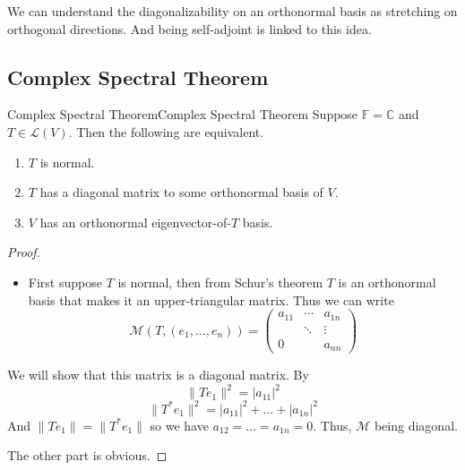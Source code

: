 \documentclass[../main.tex]{subfiles}
\begin{document}
\begin{remark}
We can understand the diagonalizability on an orthonormal basis as stretching on orthogonal directions. And being self-adjoint is linked to this idea.
\end{remark}

\subsection{Complex Spectral Theorem}

\begin{theorem}{Complex Spectral Theorem}{Complex Spectral Theorem}
Suppose $\mathbb{F}=\mathbb{C}$ and $T\in \mathscr{L}(V)$. Then the following are equivalent.
\begin{enumerate}
	\item $T$ is normal.
	\item $T$ has a diagonal matrix to some orthonormal basis of $V$.
	\item $V$ has an orthonormal eigenvector-of-$T$ basis.
\end{enumerate}
\end{theorem}
\begin{proof}
\begin{itemize}
\item First suppose $T$ is normal, then from Schur's theorem $T$ is an orthonormal basis that makes it an upper-triangular matrix. Thus we can write
	\begin{equation*}
	\mathscr{M}(T,(e_1, \ldots ,e_n)) = 
	\begin{pmatrix}
		a_{11} & \cdots & a _{1n}\\
		       & \ddots & \vdots \\
		0&& a _{nn}
	\end{pmatrix}
	\end{equation*}
\end{itemize}
We will show that this matrix is a diagonal matrix. By
\begin{equation*}
\|Te_1\|^2 = \left|a _{11}\right|^2
\end{equation*}
\begin{equation*}
\|T^*e_1\|^2 = \left|a _{11}\right|^2 + \ldots + \left|a _{1n}\right|^2
\end{equation*}
And $\|Te_1\| = \|T^*e_1\|$ so we have $a_{12}=\ldots =a_{1n}=0$. Thus,  $\mathscr{M}$ being diagonal.
\item The other part is obvious.
\end{proof}
\end{document}
